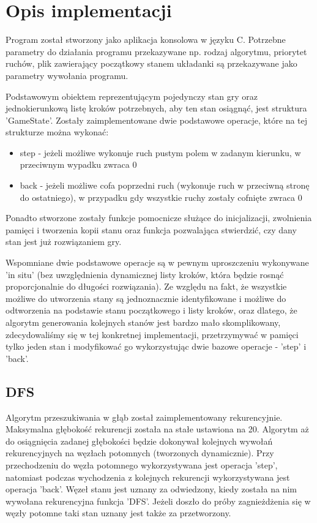 \documentclass{classrep}
\begin{document}
    \section{Opis implementacji} {
        Program został stworzony jako aplikacja konsolowa w języku C. Potrzebne parametry
        do działania programu przekazywane np. rodzaj algorytmu, priorytet ruchów,
        plik zawierający początkowy stanem układanki są przekazywane jako parametry wywołania
        programu.

        Podstawowym obiektem reprezentującym pojedynczy stan gry oraz jednokierunkową listę kroków
        potrzebnych, aby ten stan osiągnąć, jest struktura 'GameState'. Zostały zaimplementowane
        dwie podstawowe operacje, które na tej strukturze można wykonać:
        \begin{itemize}
            \item step - jeżeli możliwe wykonuje ruch pustym polem w zadanym
            kierunku, w przeciwnym wypadku zwraca 0
            \item back - jeżeli możliwe cofa poprzedni ruch (wykonuje ruch w przeciwną stronę
            do ostatniego), w przypadku gdy wszystkie ruchy zostały cofnięte zwraca 0
        \end{itemize}
        Ponadto stworzone zostały funkcje pomocnicze służące do inicjalizacji, zwolnienia
        pamięci i tworzenia kopii stanu oraz funkcja pozwalająca stwierdzić, czy dany
        stan jest już rozwiązaniem gry.

        Wspomniane dwie podstawowe operacje są w pewnym uproszczeniu wykonywane 'in situ'
        (bez uwzględnienia dynamicznej listy kroków, która będzie rosnąć proporcjonalnie do
        długości rozwiązania). Ze względu na fakt, że wszystkie możliwe do utworzenia stany są
        jednoznacznie identyfikowane i możliwe do odtworzenia na podstawie stanu początkowego i
        listy kroków, oraz dlatego, że algorytm generowania kolejnych stanów jest bardzo mało
        skomplikowany, zdecydowaliśmy się w tej konkretnej implementacji, przetrzymywać w pamięci
        tylko jeden stan i modyfikować go wykorzystując dwie bazowe operacje - 'step' i 'back'.


        \subsection{DFS} {
            Algorytm przeszukiwania w głąb został zaimplementowany rekurencyjnie. Maksymalna
            głębokość rekurencji została na stałe ustawiona na 20. Algorytm aż do osiągnięcia
            zadanej głębokości będzie dokonywał kolejnych wywołań rekurencyjnych na węzłach
            potomnych (tworzonych dynamicznie). Przy przechodzeniu do węzła potomnego wykorzystywana
            jest operacja 'step', natomiast podczas wychodzenia z kolejnych rekurencji wykorzystywana
            jest operacja 'back'. Węzeł stanu jest uznany za odwiedzony, kiedy została na nim
            wywołana rekurencyjna funkcja 'DFS'. Jeżeli doszło do próby zagnieżdżenia się w
            węzły potomne taki stan uznany jest także za przetworzony.
        }

}
\end{document}
